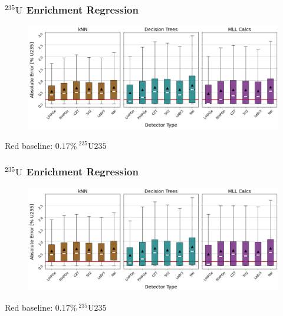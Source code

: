 \begin{frame}
  \frametitle{${}^{235}\text{U}$ Enrichment Regression}
  \begin{adjustwidth}{-15pt}{-10pt}
  \begin{figure}
    \centering
    \includegraphics[width=1.1\textwidth]{./figures/abserror_boxplots_short_enri.png}
  \end{figure}
  \vspace{12pt} \centering Red baseline: $0.17\%\:{}^{235}\text{U235}$
  \end{adjustwidth}
\end{frame}

\begin{frame}
  \frametitle{${}^{235}\text{U}$ Enrichment Regression}
  \begin{adjustwidth}{-15pt}{-10pt}
  \begin{figure}
    \centering
    \includegraphics[width=1.1\textwidth]{./figures/abserror_boxplots_long_enri.png}
  \end{figure}
  \vspace{12pt} \centering Red baseline: $0.17\%\:{}^{235}\text{U235}$
  \end{adjustwidth}
\end{frame}

